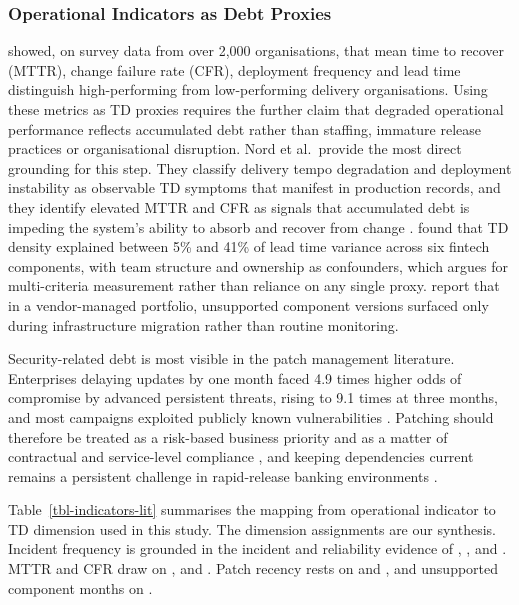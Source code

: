 \documentclass[
  authoryear,
  preprint]{elsarticle}
\begin{document}
\subsubsection{Operational Indicators as Debt
Proxies}\label{operational-indicators-as-debt-proxies}

\citet{forsgrenAccelerate2018} showed, on survey data from over 2,000
organisations, that mean time to recover (MTTR), change failure rate
(CFR), deployment frequency and lead time distinguish high-performing
from low-performing delivery organisations. Using these metrics as TD
proxies requires the further claim that degraded operational performance
reflects accumulated debt rather than staffing, immature release
practices or organisational disruption. Nord et al.~provide the most
direct grounding for this step. They classify delivery tempo degradation
and deployment instability as observable TD symptoms that manifest in
production records, and they identify elevated MTTR and CFR as signals
that accumulated debt is impeding the system's ability to absorb and
recover from change \citep{nordExamplesTechnicalDebts2021}.
\citet{paudelExploringRelationshipTechnical2025} found that TD density
explained between 5\% and 41\% of lead time variance across six fintech
components, with team structure and ownership as confounders, which
argues for multi-criteria measurement rather than reliance on any single
proxy. \citet{nielsenITPortfolioManagement2022} report that in a
vendor-managed portfolio, unsupported component versions surfaced only
during infrastructure migration rather than routine monitoring.

Security-related debt is most visible in the patch management
literature. Enterprises delaying updates by one month faced 4.9 times
higher odds of compromise by advanced persistent threats, rising to 9.1
times at three months, and most campaigns exploited publicly known
vulnerabilities \citep{tizioSoftwareUpdatesStrategies2023}. Patching
should therefore be treated as a risk-based business priority
\citep{markkanenPatchManagementPlanning2023} and as a matter of
contractual and service-level compliance \citep{nursePatchNotPatch2025},
and keeping dependencies current remains a persistent challenge in
rapid-release banking environments \citep{kulaReleasingFastSlow2019}.

Table~\ref{tbl-indicators-lit} summarises the mapping from operational
indicator to TD dimension used in this study. The dimension assignments
are our synthesis. Incident frequency is grounded in the incident and
reliability evidence of
\citet{detoledoReducingIncidentsMicroservices2021},
\citet{ramasubbuControllingTechnicalDebt2021},
\citet{ramasubbuManagingTechnicalDebt2015} and
\citet{nielsenITPortfolioManagement2022}. MTTR and CFR draw on
\citet{forsgrenAccelerate2018}, \citet{nordExamplesTechnicalDebts2021}
and \citet{paudelExploringRelationshipTechnical2025}. Patch recency
rests on \citet{tizioSoftwareUpdatesStrategies2023} and
\citet{markkanenPatchManagementPlanning2023}, and unsupported component
months on \citet{hakiDigitalNudgingTechnical2023}.
\end{document}
